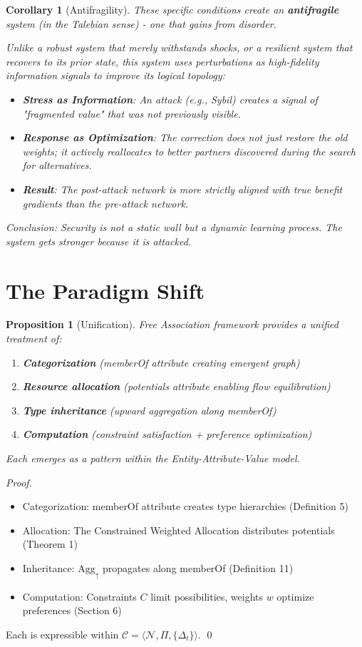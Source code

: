 \documentclass[11pt]{article}
\newtheorem{proposition}{Proposition}
\newtheorem{corollary}{Corollary}
\begin{document}
\begin{corollary}[Antifragility]
These specific conditions create an \textbf{antifragile} system (in the Talebian sense) - one that gains from disorder. 

Unlike a \textit{robust} system that merely withstands shocks, or a \textit{resilient} system that recovers to its prior state, this system uses perturbations as high-fidelity information signals to improve its logical topology:
\begin{itemize}
    \item \textbf{Stress as Information}: An attack (e.g., Sybil) creates a signal of "fragmented value" that was not previously visible.
    \item \textbf{Response as Optimization}: The correction does not just restore the old weights; it actively reallocates to \textit{better} partners discovered during the search for alternatives.
    \item \textbf{Result}: The post-attack network is more strictly aligned with true benefit gradients than the pre-attack network.
\end{itemize}
Conclusion: Security is not a static wall but a dynamic learning process. The system gets stronger \textit{because} it is attacked.
\end{corollary}

\section{The Paradigm Shift}

\begin{proposition}[Unification]
Free Association framework provides a unified treatment of:
\begin{enumerate}
\item \textbf{Categorization} (memberOf attribute creating emergent graph)
\item \textbf{Resource allocation} (potentials attribute enabling flow equilibration)
\item \textbf{Type inheritance} (upward aggregation along memberOf)
\item \textbf{Computation} (constraint satisfaction + preference optimization)
\end{enumerate}
Each emerges as a pattern within the Entity-Attribute-Value model.
\end{proposition}

\begin{proof}
\begin{itemize}
\item Categorization: memberOf attribute creates type hierarchies (Definition 5)
\item Allocation: The Constrained Weighted Allocation distributes potentials (Theorem 1)
\item Inheritance: $\text{Agg}_\uparrow$ propagates along memberOf (Definition 11)
\item Computation: Constraints $C$ limit possibilities, weights $w$ optimize preferences (Section 6)
\end{itemize}
Each is expressible within $\mathcal{C} = \langle \mathcal{N}, \Pi, \{\Delta_t\} \rangle$. \qed
\end{proof}
\end{document}
